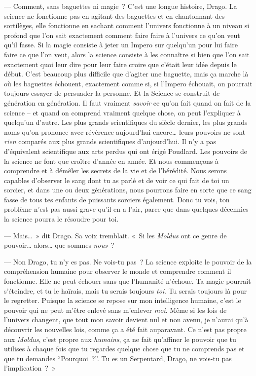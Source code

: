 --- Comment, sans baguettes ni magie~? C'est une longue histoire, Drago. La science ne fonctionne pas en agitant des baguettes et en chantonnant des sortilèges, elle fonctionne en sachant comment l'univers fonctionne à un niveau si profond que l'on sait exactement comment faire faire à l'univers ce qu'on veut qu'il fasse. Si la magie consiste à jeter un Impero sur quelqu'un pour lui faire faire ce que l'on veut, alors la science consiste à les connaître si bien que l'on sait exactement quoi leur dire pour leur faire croire que c'était leur idée depuis le début. C'est beaucoup plus difficile que d'agiter une baguette, mais ça marche là où les baguettes échouent, exactement comme si, si l'Impero échouait, on pourrait toujours essayer de persuader la personne. Et la Science se construit de génération en génération. Il faut vraiment \emph{savoir} ce qu'on fait quand on fait de la science -- et quand on comprend vraiment quelque chose, on peut l'expliquer à quelqu'un d'autre. Les plus grands scientifiques du siècle dernier, les plus grands noms qu'on prononce avec révérence aujourd'hui encore… leurs pouvoirs ne sont \emph{rien} comparés aux plus grands scientifiques d'aujourd'hui. Il n'y a pas d'équivalent scientifique aux arts perdus qui ont érigé Poudlard. Les pouvoirs de la science ne font que croître d'année en année. Et nous commençons à comprendre et à démêler les secrets de la vie et de l'hérédité. Nous serons capables d'observer le sang dont tu as parlé et de voir ce qui fait de toi un sorcier, et dans une ou deux générations, nous pourrons faire en sorte que ce sang fasse de tous tes enfants de puissants sorciers également. Donc tu vois, ton problème n'est pas aussi grave qu'il en a l'air, parce que dans quelques décennies la science pourra le résoudre pour toi.

--- Mais…~» dit Drago. Sa voix tremblait. «~Si les \emph{Moldus} ont ce genre de pouvoir… alors… que sommes \emph{nous}~?

--- Non Drago, tu n'y es pas. Ne vois-tu pas~? La science exploite le pouvoir de la compréhension humaine pour observer le monde et comprendre comment il fonctionne. Elle ne peut échouer sans que l'humanité n'échoue. Ta magie pourrait s'éteindre, et tu le haïrais, mais tu serais toujours \emph{toi}. Tu serais toujours là pour le regretter. Puisque la science se repose sur mon intelligence humaine, c'est le pouvoir qui ne peut m'être enlevé sans m'enlever \emph{moi}. Même si les lois de l'univers changent, que tout mon savoir devient nul et non avenu, je n'aurai qu'à découvrir les nouvelles lois, comme ça a été fait auparavant. Ce n'est pas propre aux \emph{Moldus}, c'est propre aux \emph{humains}, ça ne fait qu'affiner le pouvoir que tu utilises à chaque fois que tu regardes quelque chose que tu ne comprends pas et que tu demandes “Pourquoi~?”. Tu es un Serpentard, Drago, ne vois-tu pas l'implication~?~»

